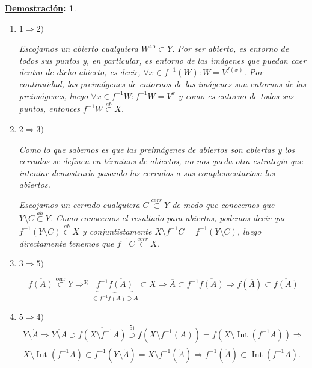 \documentclass[10pt,a4paper,openright]{book}
\theoremstyle{break}
\newtheorem*{demo}{\underline{Demostración}:}
\DeclareMathOperator{\inter}{Int}
\begin{document}
\begin{demo}
\begin{enumerate}
    \item $1 \Rightarrow 2)$
    
    Escojamos un abierto cualquiera $W^{\text{ab}} \subset Y$. Por ser abierto, es entorno de todos sus puntos y, en particular, es entorno de las imágenes que puedan caer dentro de dicho abierto, es decir, $\forall x \in f^{-1} (W) : W = V^{f(x)}$. Por continuidad, las preimágenes de entornos de las imágenes son entornos de las preimágenes, luego $\forall x \in f^{-1} W : f^{-1}W = V^x$ y como es entorno de todos sus puntos, entonces $f^{-1} W \stackrel{ab}{\subset} X$.
    \item $2 \Rightarrow 3)$
    
    Como lo que sabemos es que las preimágenes de abiertos son abiertas y los cerrados se definen en términos de abiertos, no nos queda otra estrategia que intentar demostrarlo pasando los cerrados a sus complementarios: los abiertos.
    
    Escojamos un cerrado cualquiera $C \stackrel{cerr}{\subset} Y$ de modo que conocemos que $Y \setminus C \stackrel{ab}{\subset} Y$. Como conocemos el resultado para abiertos, podemos decir que $f^{-1}\left( Y\setminus C \right) \stackrel{ab}{\subset} X$ y conjuntistamente $X \setminus f^{-1}C = f^{-1}\left( Y\setminus C \right)$, luego directamente tenemos que $f^{-1}C \stackrel{cerr}{\subset} X$. 
    \item $3 \Rightarrow 5)$

    \[
        \overline{f\left( A \right)} \stackrel{\text{cerr}}{\subset} Y \Rightarrow^{3)} \underbrace{f^{-1}\overline{f\left( A \right)}}_{\subset f^{-1}f\left( A \right) \supset A} \subset X \Rightarrow \overline{A} \subset f^{-1}\overline{f\left( A \right)} \Rightarrow f\left( \overline{A} \right) \subset \overline{f\left( A \right)} 
    \]
    \item $5 \Rightarrow 4)$
    \begin{gather*}
        Y \setminus \mathring{A}\Rightarrow \overline{Y\setminus A} \supset \overline{f\left( X \setminus f^{-1}A \right)} \stackrel{5)}{\supset} f\left( \overline{X \setminus f^{-1}\left( A \right)} \right) = f\left( X \setminus \inter\left( f^{-1}A \right) \right) \Rightarrow\\
        X \setminus \inter\left( f^{-1}A \right) \subset f^{-1}\left( Y\setminus \mathring{A} \right) = X \setminus f^{-1}\left( \mathring{A} \right)\Rightarrow f^{-1}\left( \mathring{A} \right) \subset \inter\left( f^{-1}A \right) 
    .\end{gather*}


\end{enumerate}
\end{demo}
\end{document}
